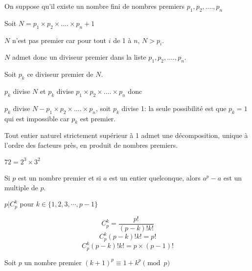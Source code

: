 \documentclass[french]{book}
\begin{document}
\begin{demo}

On suppose qu'il existe un nombre fini de nombres premiers $p_{1}, p_{2}, .... ,p_{n}$


Soit $N=p_{1}\times p_{2}\times .... \times p_{n}+1$

$N$ n'est pas premier car pour tout $i$ de 1 à $n$, $N> p_{i}$.

 $N$ admet donc un diviseur premier dans la liste $p_{1}, p_{2}, .... ,p_{n}$. 

Soit $p_{k}$ ce diviseur premier de $N$.

$p_{k}$ divise $N$ et $p_{k}$ divise $p_{1}\times p_{2}\times .... \times p_{n}$ donc

$p_{k}$ divise $N-p_{1}\times p_{2}\times .... \times p_{n}$, soit $p_{k}$ divise 1: la seule possibilité est que $p_{k}=1$ qui est impossible car $p_{k}$ est premier.

\end{demo}

\begin{thm}

Tout entier naturel strictement supérieur à 1 admet une décomposition, unique à l'ordre des facteurs près, en produit de nombres premiers.

\end{thm}

\begin{exemple}

$72=2^{3}\times 3^{2}$
\end{exemple}


\begin{thm}
Si $p$ est un nombre premier et si $a$ est un entier quelconque, alors $a^p-a$ est un multiple de $p$.
\end{thm}

\begin{lemme}
$p\vert C^k_p$ pour $k\in \{1,2,3,\cdots, p-1 \}$\\
\end{lemme}

\begin{demo}

$$C^k_p=\dfrac{p!}{(p-k)!k!}$$ 
$$C^k_p(p-k)!k!=p! $$
$$C^k_p(p-k)!k!=p\times (p-1)!$$

\end{demo}

\begin{lemme}
Soit $p$ un nombre premier $(k+1)^p \equiv 1+k^p \pmod p$
\end{lemme}
\end{document}

